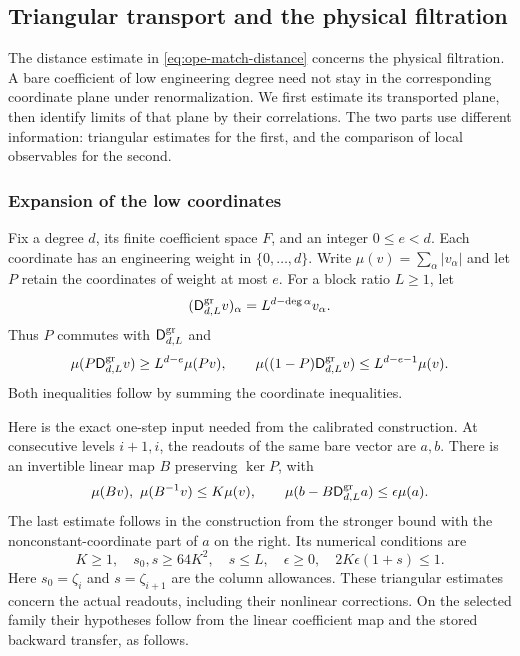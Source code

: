 \subsection{Triangular transport and the physical filtration}
\label{sec:ope-filtration}
The distance estimate in \eqref{eq:ope-match-distance} concerns the
physical filtration. A bare coefficient of low engineering degree need
not stay in the corresponding coordinate plane under renormalization.
We first estimate its transported plane, then identify limits of that
plane by their correlations. The two parts use different information:
triangular estimates for the first, and the comparison of local
observables for the second.

\subsubsection{Expansion of the low coordinates}
Fix a degree $d$, its finite coefficient space $F$, and an integer
$0\leq e<d$. Each coordinate has an engineering weight in $\{0,\ldots,d\}$.
Write $\mu(v)=\sum_\alpha|v_\alpha|$ and let $P$ retain the coordinates
of weight at most $e$. For a block ratio $L\geq1$, let
\[
 (\mathsf D^{\rm gr}_{d,L}v)_\alpha=L^{d-\deg\alpha}v_\alpha.
\]
Thus $P$ commutes with $\mathsf D^{\rm gr}_{d,L}$ and
\begin{equation}\label{eq:ope-dilation-split}
 \mu(P\mathsf D^{\rm gr}_{d,L}v)\geq L^{d-e}\mu(Pv),\qquad
 \mu((1-P)\mathsf D^{\rm gr}_{d,L}v)\leq L^{d-e-1}\mu(v).
\end{equation}
Both inequalities follow by summing the coordinate inequalities.

Here is the exact one-step input needed from the calibrated construction.
At consecutive levels $i+1,i$, the readouts of the same bare vector are
$a,b$. There is an invertible linear map $B$ preserving $\ker P$, with
\[
 \mu(Bv),\ \mu(B^{-1}v)\leq K\mu(v),\qquad
 \mu(b-B\mathsf D^{\rm gr}_{d,L}a)\leq\epsilon\mu(a).
\]
The last estimate follows in the construction from the stronger bound
with the nonconstant-coordinate part of $a$ on the right. Its numerical
conditions are
\begin{equation}\label{eq:ope-triangle-numbers}
 K\geq1,\quad s_0,s\geq64K^2,\quad s\leq L,\quad
 \epsilon\geq0,\quad 2K\epsilon(1+s)\leq1.
\end{equation}
Here $s_0=\zeta_i$ and $s=\zeta_{i+1}$ are the column allowances.
These triangular estimates concern the actual readouts, including their
nonlinear corrections. On the selected family their hypotheses follow
from the linear coefficient map and the stored backward transfer, as follows.

